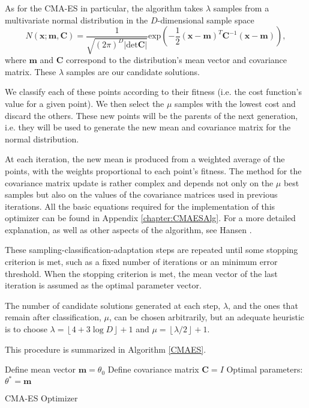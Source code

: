 As for the CMA-ES in particular, the algorithm takes $\lambda$ samples from a multivariate normal distribution in the $D$-dimensional sample space
\begin{equation}
N(\mathbf{x;m,C})=\frac{1}{\sqrt{(2\pi)^D|\mathrm{det}\mathbf{C}|}}\mathrm{exp}\left(-\frac{1}{2}(\mathbf{x}-\mathbf{m})^T\mathbf{C}^{-1}(\mathbf{x}-\mathbf{m})\right),
\end{equation}
\noindent where $\mathbf{m}$ and $\mathbf{C}$ correspond to the distribution's mean vector and covariance matrix.
These $\lambda$ samples are our candidate solutions.

We classify each of these points according to their fitness (i.e. the cost function's value for a given point). We then select the $\mu$ samples with the lowest cost and discard the others. These new points will be the parents of the next generation, i.e. they will be used to generate the new mean and covariance matrix for the normal distribution.



At each iteration, the new mean is produced from a weighted average of the points, with the weights proportional to each point's fitness.
The method for the covariance matrix update is rather complex and depends not only on the $\mu$ best samples but also on the values of the covariance matrices used in previous iterations. All the basic equations required for the implementation of this optimizer can be found in Appendix \ref{chapter:CMAESAlg}. For a more detailed explanation, as well as other aspects of the algorithm, see Hansen \cite{Hansen}.

These sampling-classification-adaptation steps are repeated until some stopping criterion is met, such as a fixed number of iterations or an minimum error threshold.
When the stopping criterion is met, the mean vector of the last iteration is assumed as the optimal parameter vector.


The number of candidate solutions generated at each step, $\lambda$, and the ones that remain after classification, $\mu$, can be chosen arbitrarily, but an adequate heuristic is to choose $\lambda=\left\lfloor4+3\log D\right\rfloor+1$ and $\mu=\left\lfloor\lambda/2\right\rfloor+1$.

This procedure is summarized in Algorithm \ref{CMAES}.

\begin{algorithm}[H]\label{CMAES}
\DontPrintSemicolon
Define mean vector $\mathbf{m}=\theta_0$
Define covariance matrix $\mathbf{C}=I$\;
 Optimal parameters: $\theta^{*}=\mathbf{m}$\;
 \caption{CMA-ES Optimizer}
\end{algorithm}
\

